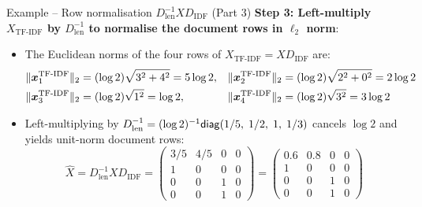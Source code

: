 \documentclass[aspectratio=169]{beamer}\usepackage[]{graphicx}\usepackage[]{xcolor}
\begin{document}
\begin{frame}{Example -- Row normalisation $D_{\text{len}}^{-1} X D_{\text{IDF}}$ (Part 3)}
\textbf{Step 3: Left-multiply $X_{\text{TF-IDF}}$ by $D_{\text{len}}^{-1}$ to normalise the document rows in $\ell_2$ norm}:
\begin{itemize}
\item The Euclidean norms of the four rows of $X_{\text{TF-IDF}} = X D_{\text{IDF}}$ are:
\begin{align*}
\|\bm{x}_1^{\text{TF-IDF}}\|_2 &= (\log 2)\sqrt{3^2 + 4^2} = 5\log 2, &
\|\bm{x}_2^{\text{TF-IDF}}\|_2 &= (\log 2)\sqrt{2^2 + 0^2} = 2\log 2 \\
\|\bm{x}_3^{\text{TF-IDF}}\|_2 &= (\log 2)\sqrt{1^2} = \log 2, &
\|\bm{x}_4^{\text{TF-IDF}}\|_2 &= (\log 2)\sqrt{3^2} = 3\log 2
\end{align*}
\item Left-multiplying by $D_{\text{len}}^{-1} = (\log 2)^{-1}\mathsf{diag}(1/5,\; 1/2,\; 1,\; 1/3)$ cancels $\log 2$ and yields unit-norm document rows:
\[
\hat{X} = D_{\text{len}}^{-1} X D_{\text{IDF}} =
\begin{pmatrix}
3/5 & 4/5 & 0 & 0 \\
1 & 0 & 0 & 0 \\
0 & 0 & 1 & 0 \\
0 & 0 & 1 & 0
\end{pmatrix}
=
\begin{pmatrix}
0.6 & 0.8 & 0 & 0 \\
1 & 0 & 0 & 0 \\
0 & 0 & 1 & 0 \\
0 & 0 & 1 & 0
\end{pmatrix}
\]
\end{itemize}
\end{frame}


\end{document}
